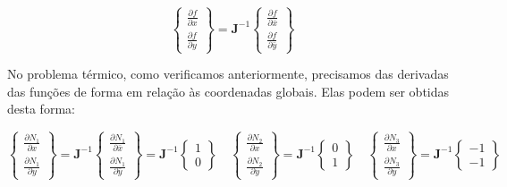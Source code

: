         \begin{equation}
            \begin{Bmatrix}
                \frac{\partial f}{\partial x} \\
                \frac{\partial f}{\partial y}
            \end{Bmatrix} = 
            \mathbf{J}^{-1}
            \begin{Bmatrix}
                \frac{\partial f}{\partial \bar{x}} \\
                \frac{\partial f}{\partial \bar{y}}
            \end{Bmatrix}
        \end{equation}

        No problema térmico, como verificamos anteriormente, precisamos das derivadas das funções de forma em relação às coordenadas globais. Elas podem ser obtidas desta forma:

        \begin{equation}
            \begin{Bmatrix}
                \frac{\partial N_1}{\partial x} \\
                \frac{\partial N_1}{\partial y}
            \end{Bmatrix} = 
            \mathbf{J}^{-1}
            \begin{Bmatrix}
                \frac{\partial N_1}{\partial \bar{x}} \\
                \frac{\partial N_1}{\partial \bar{y}}
            \end{Bmatrix} = 
            \mathbf{J}^{-1}
            \begin{Bmatrix}
                1 \\
                0
            \end{Bmatrix}
            \quad 
            \begin{Bmatrix}
                \frac{\partial N_2}{\partial x} \\
                \frac{\partial N_2}{\partial y}
            \end{Bmatrix} = 
            \mathbf{J}^{-1}
            \begin{Bmatrix}
                0 \\
                1
            \end{Bmatrix}
            \quad
            \begin{Bmatrix}
                \frac{\partial N_3}{\partial x} \\
                \frac{\partial N_3}{\partial y}
            \end{Bmatrix} = 
            \mathbf{J}^{-1}
            \begin{Bmatrix}
                -1 \\
                -1
            \end{Bmatrix}
        \end{equation}

